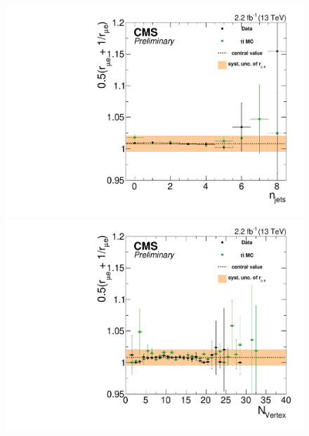 \begin{figure}[htbp]
  \centering
  \begin{minipage}[t]{0.3\textwidth}
    \includegraphics[width=\textwidth]{bkgd/figs/rSFOFFromRMuE_ZPeakControlCentral_Run2015_25ns_NJets_None.pdf}
  \end{minipage}
  \begin{minipage}[t]{0.3\textwidth}
    \includegraphics[width=\textwidth]{bkgd/figs/rSFOFFromRMuE_ZPeakControlCentral_Run2015_25ns_nVtx_None.pdf}
  \end{minipage}
  \begin{minipage}[t]{0.3\textwidth}

\end{minipage}
\end{figure}

